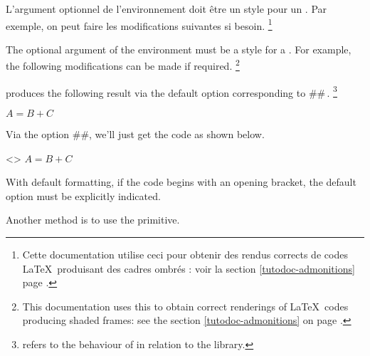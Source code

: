 \begin{tdocnote}
	L'argument optionnel de l'environnement  doit être un style pour un . Par exemple, on peut faire les modifications suivantes si besoin.%
	\footnote{
		Cette documentation utilise ceci pour obtenir des rendus corrects de codes \LaTeX\ produisant des cadres ombrés : voir la section \ref{tutodoc-admonitions} page \pageref{tutodoc-admonitions}.
	}

	The optional argument of the  environment must be a style for a . For example, the following modifications can be made if required.
	\footnote{
		This documentation uses this to obtain correct renderings of \LaTeX\ codes producing shaded frames: see the section \ref{tutodoc-admonitions} on page \pageref{tutodoc-admonitions}.
	}


\end{tdocnote}




\begin{tdocexa}[Following]
     produces the following result via the default option corresponding to \tdoclatexin##\,.
    \footnote{
         refers to the  behaviour of  in relation to the  library.
    }

    \begin{tdoclatex}
        $A = B + C$
    \end{tdoclatex}
\end{tdocexa}




\begin{tdocexa}
    Via the option \tdoclatexin##, we'll just get the code as shown below.

    \begin{tdoclatex}<>
        $A = B + C$
    \end{tdoclatex}
\end{tdocexa}




\begin{tdocwarn}
    With default formatting, if the code begins with an opening bracket, the default option must be explicitly indicated.


    \smallskip

    Another method is to use the  primitive.

\end{tdocwarn}


